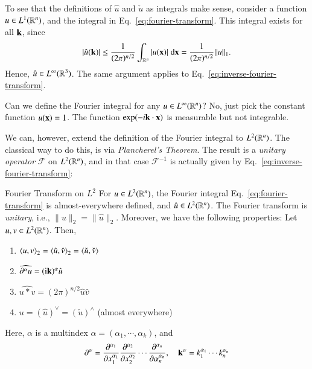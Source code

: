 To see that the definitions of $\hat{u}$ and $\check{u}$ as integrals make sense, consider a function $u \in L^1(\mathbb{R}^n)$, and the integral in Eq.~\eqref{eq:fourier-transform}. This integral exists for all $\mathbf{k}$, since
\begin{equation}
    |\hat{u}(\mathbf{k})| \leq \frac{1}{(2\pi)^{n/2}} \int_{\mathbb{R}^n} | u(\mathbf{x})| \; \mathrm{d}\mathbf{x} = \frac{1}{(2\pi)^{n/2}} \|u\|_1.
\end{equation}
Hence, $\hat{u} \in L^\infty(\mathbb{R}^3)$. The same argument applies to Eq.~\eqref{eq:inverse-fourier-transform}. 



Can we define the Fourier integral for any $u \in L^\infty(\mathbb{R}^n)$? No, just pick the constant function $u(\mathbf{x}) = 1$. The function $\exp(-i\mathbf{k}\cdot\mathbf{x})$ is measurable but not integrable.

We can, however, extend the definition of the Fourier integral to $L^2(\mathbb{R}^n)$. The classical way to do this, is via \emph{Plancherel's Theorem}. The result is a \emph{unitary operator} $\mathcal{F}$ on $L^2(\mathbb{R}^n)$, and in that case $\mathcal{F}^{-1}$ is actually given by Eq.~\eqref{eq:inverse-fourier-transform}:
\begin{myTheorem}{Fourier Transform on $L^2$}{}
For $u \in L^2(\mathbb{R}^n)$, the Fourier integral Eq.~\eqref{eq:fourier-transform} is almost-everywhere defined, and $\hat{u} \in L^2(\mathbb{R}^n)$. The Fourier transform is \emph{unitary}, i.e., $\|u\|_2 = \|\hat{u}\|_2$. Moreover, we have the following properties: Let $u,v\in L^2(\mathbb{R}^n)$. Then,
\begin{enumerate}
    \item $\braket{u,v}_2 = \braket{\hat{u},\hat{v}}_2 = \braket{\check{u},\check{v}}$
    \item $\widehat{\partial^\alpha u} = (\mathrm{i}\mathbf{k})^\alpha \hat{u}$ 
    \item $\widehat{u * v} = (2\pi)^{n/2} \hat{u}\hat{v}$ 
    \item $u = (\hat{u})^\vee = (\check{u})^\wedge$ (almost everywhere) 
\end{enumerate}
\end{myTheorem}

Here, $\alpha$ is a multindex $\alpha = (\alpha_1,\cdots,\alpha_k)$, and 
\begin{equation}
    \partial^\alpha = \frac{\partial ^{\alpha_1}}{\partial x_1^{\alpha_1}}\frac{\partial ^{\alpha_2}}{\partial x_2^{\alpha_2}}\cdots\frac{\partial ^{\alpha_n}}{\partial \alpha_n^{\alpha_n}}, \quad \mathbf{k}^\alpha = k_1^{\alpha_1}\cdots k_n^{\alpha_n}
\end{equation}

